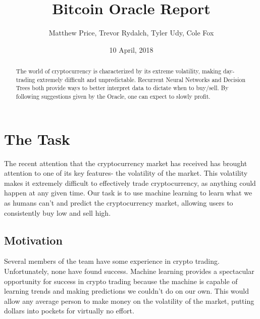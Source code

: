 \documentclass{article}
\begin{document}
\lstset{
  language=Python,
  basicstyle=\small,          %
  keywordstyle=\bfseries,
  identifierstyle=,           %
  commentstyle=,              %
  stringstyle=\ttfamily,      %
  showstringspaces=false,     %
  numbers=left,
  numberstyle=\tiny,
  numbersep=5pt,
  frame=tb,
}

\title{Bitcoin Oracle Report}

\author{Matthew Price, Trevor Rydalch, Tyler Udy, Cole Fox}

\date{10 April, 2018}

\maketitle

\begin{abstract}  
  The world of cryptocurrency is characterized by its extreme volatility, making day-trading extremely difficult and unpredictable. Recurrent Neural Networks and Decision Trees both provide ways to better interpret data to dictate when to buy/sell. By following suggestions given by the Oracle, one can expect to slowly profit.
\end{abstract}

\section{ The Task }
The recent attention that the cryptocurrency market has received has brought attention to one of its key features- the volatility of the market. This volatility makes it extremely difficult to effectively trade cryptocurrency, as anything could happen at any given time. Our task is to use machine learning to learn what we as humans can't and predict the cryptocurrency market, allowing users to consistently buy low and sell high.

\subsection{ Motivation }
Several members of the team have some experience in crypto trading. Unfortunately, none have found success. Machine learning provides a spectacular opportunity for success in crypto trading because the machine is capable of learning trends and making predictions we couldn't do on our own. This would allow any average person to make money on the volatility of the market, putting dollars into pockets for virtually no effort. \\
\end{document}
